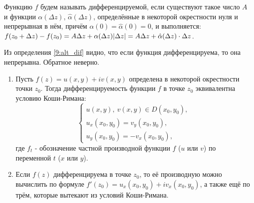 \begin{definition}\label{9:alt_dif}
Функцию \(f\) будем называть дифференцируемой, если существуют такое число \(A\) и функции
\(\alpha(\Delta z)\), \(\hat{\alpha}(\Delta z)\), определённые в некоторой окрестности нуля и
непрерывная в нём, причём \(\alpha (0) = \hat{\alpha} (0) = 0\), и выполняется: \(f(z_0 + \Delta z)
- f(z_0) \hm= A\Delta z + \alpha (\Delta z) |\Delta z| = A\Delta z + \hat{\alpha}(\Delta z) \cdot
\Delta z\).
\end{definition}

\begin{note}
Из определения \ref{9:alt_dif} видно, что если функция дифференцируема, то она непрерывна. Обратное
неверно.
\end{note}

\begin{statement} \label{9:Koshi_Riman} \leavevmode
    \begin{enumerate}[wide=20pt, label=\arabic*., itemsep=1ex]
    \item Пусть \(f(z) = u(x, y) + iv(x, y)\) определена в некоторой окрестности точки \(z_0\).
    Тогда дифференцируемость функции \(f\) в точке \(z_0\) эквивалентна условию Коши-Римана:
    \begin{equation*}
    \begin{cases}
    u(x, y), \ v(x,y) \in D(x_0, y_0), \\
    u_x (x_0, y_0) = v_y (x_0, y_0), \\
    u_y (x_0, y_0) = - v_x (x_0, y_0),
    \end{cases}
    \end{equation*}
    где \(f_t\) - обозначение частной производной функции \(f\) (\(u\) или \(v\)) по переменной
    \(t\) (\(x\) или \(y\)).

    \item Если \(f(z)\) дифференцируема в точке \(z_0\), то её производную можно вычислить по
    формуле \(f'(z_0) = u_x(x_0, y_0) + iv_x(x_0, y_0)\), а также ещё по трём, которые вытекают из
    условий Коши-Римана.
\end{enumerate}
\end{statement}
